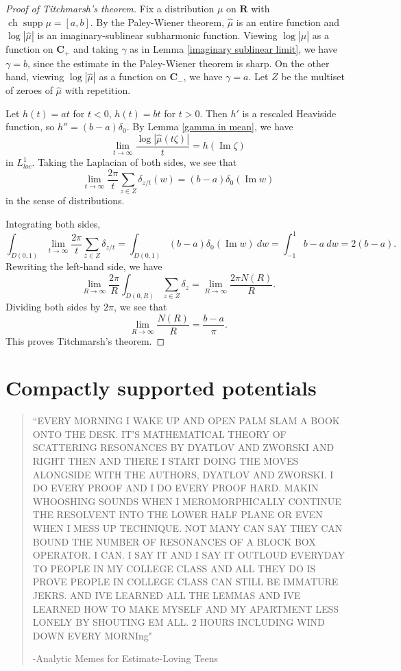 \documentclass[12pt]{report}
\newcommand{\RR}{\mathbf{R}}
\newcommand{\CC}{\mathbf{C}}
\DeclareMathOperator{\ch}{ch}
\DeclareMathOperator{\supp}{supp}
\renewcommand{\Im}{\operatorname{Im}}
\theoremstyle{definition}
\begin{document}
\begin{proof}[Proof of Titchmarsh's theorem]
Fix a distribution $\mu$ on $\RR$ with $\ch \supp \mu = [a, b]$. By the Paley-Wiener theorem, $\hat \mu$ is an entire function and $\log |\hat \mu|$ is an imaginary-sublinear subharmonic function. Viewing $\log |\hat \mu|$ as a function on $\CC_+$ and taking $\gamma$ as in Lemma \ref{imaginary sublinear limit}, we have $\gamma = b$, since the estimate in the Paley-Wiener theorem is sharp. On the other hand, viewing $\log |\hat \mu|$ as a function on $\CC_-$, we have $\gamma = a$. Let $Z$ be the multiset of zeroes of $\hat \mu$ with repetition.

Let $h(t) = at$ for $t < 0$, $h(t) = bt$ for $t > 0$. Then $h'$ is a rescaled Heaviside function, so $h'' = (b-a)\delta_0$. By Lemma \ref{gamma in mean}, we have
$$\lim_{t \to \infty} \frac{\log |\hat \mu(t\zeta)|}{t} = h(\Im \zeta)$$
in $L^1_{loc}$. Taking the Laplacian of both sides, we see that
$$\lim_{t \to \infty} \frac{2\pi}{t} \sum_{z \in Z} \delta_{z/t}(w) = (b-a)\delta_0(\Im w)$$
in the sense of distributions.

Integrating both sides,
$$\int_{D(0, 1)} \lim_{t \to \infty} \frac{2\pi}{t} \sum_{z \in Z} \delta_{z/t} = \int_{D(0, 1)} (b-a)\delta_0(\Im w) ~dw = \int_{-1}^1 b - a ~dw = 2(b - a).$$
Rewriting the left-hand side, we have
$$\lim_{R \to \infty} \frac{2\pi }{R} \int_{D(0, R)} \sum_{z \in Z} \delta_z = \lim_{R \to \infty} \frac{2\pi N(R)}{R}.$$
Dividing both sides by $2\pi$, we see that
$$\lim_{R \to \infty} \frac{N(R)}{R} = \frac{b - a}{\pi}.$$
This proves Titchmarsh's theorem.
\end{proof}


\chapter{Compactly supported potentials}
\begin{quote}
  ``EVERY MORNING I WAKE UP AND OPEN PALM SLAM A BOOK ONTO THE DESK. IT'S MATHEMATICAL THEORY OF SCATTERING RESONANCES BY DYATLOV AND ZWORSKI AND RIGHT THEN AND THERE I START DOING THE MOVES ALONGSIDE WITH THE AUTHORS, DYATLOV AND ZWORSKI. I DO EVERY PROOF AND I DO EVERY PROOF HARD. MAKIN WHOOSHING SOUNDS WHEN I MEROMORPHICALLY CONTINUE THE RESOLVENT INTO THE LOWER HALF PLANE OR EVEN WHEN I MESS UP TECHNIQUE. NOT MANY CAN SAY THEY CAN BOUND THE NUMBER OF RESONANCES OF A BLOCK BOX OPERATOR. I CAN. I SAY IT AND I SAY IT OUTLOUD EVERYDAY TO PEOPLE IN MY COLLEGE CLASS AND ALL THEY DO IS PROVE PEOPLE IN COLLEGE CLASS CAN STILL BE IMMATURE JEKRS. AND IVE LEARNED ALL THE LEMMAS AND IVE LEARNED HOW TO MAKE MYSELF AND MY APARTMENT LESS LONELY BY SHOUTING EM ALL. 2 HOURS INCLUDING WIND DOWN EVERY MORNIng"

  -Analytic Memes for Estimate-Loving Teens
\end{quote}
\end{document}
